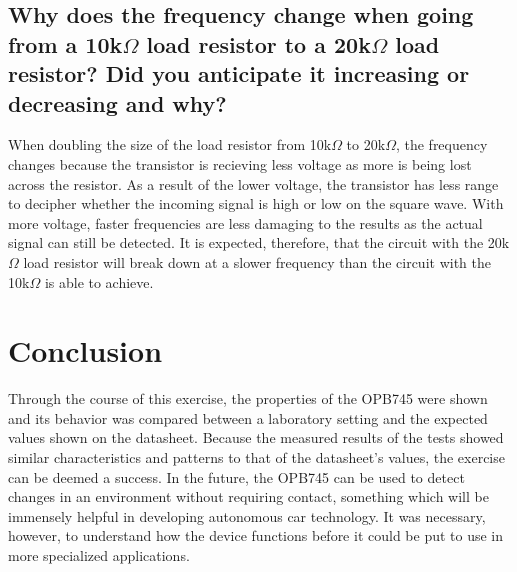 \documentclass[conference]{IEEEtran}
\begin{document}
\subsection{Why does the frequency change when going from a 10k$\Omega$ load resistor to a 20k$\Omega$ load resistor?
Did you anticipate it increasing or decreasing and why?}

When doubling the size of the load resistor from 10k$\Omega$  to 20k$\Omega$, the frequency changes because the transistor is recieving
less voltage as more is being lost across the resistor. As a result of the lower voltage, the transistor has less range to decipher
whether the incoming signal is high or low on the square wave. With more voltage, faster frequencies are less damaging to the results as
the actual signal can still be detected. It is expected, therefore, that the circuit with the 20k$\Omega$ load resistor will break down
at a slower frequency than the circuit with the 10k$\Omega$ is able to achieve.

\section{Conclusion}
Through the course of this exercise, the properties of the OPB745 were shown and its behavior was compared between a laboratory
setting and the expected values shown on the datasheet. Because the measured results of the tests showed similar characteristics and
patterns to that of the datasheet's values, the exercise can be deemed a success. In the future, the OPB745 can be used to detect changes
in an environment without requiring contact, something which will be immensely helpful in developing autonomous car technology. It was
necessary, however, to understand how the device functions before it could be put to use in more specialized applications.
\end{document}
